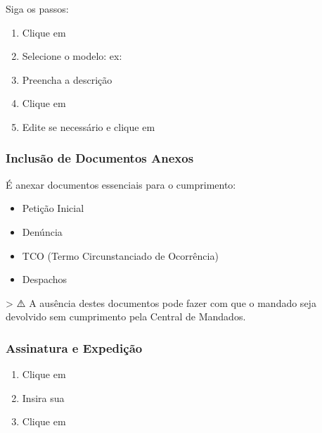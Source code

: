 \documentclass[letterpaper,10pt,brazil]{sphinxmanual}
\begin{document}
\sphinxAtStartPar
Siga os passos:
\begin{enumerate}
%
\item {} 
\sphinxAtStartPar
Clique em 

\item {} 
\sphinxAtStartPar
Selecione o modelo: ex: 

\item {} 
\sphinxAtStartPar
Preencha a descrição

\item {} 
\sphinxAtStartPar
Clique em 

\item {} 
\sphinxAtStartPar
Edite se necessário e clique em 

\end{enumerate}


\subsubsection{Inclusão de Documentos Anexos}
\label{\detokenize{projud_32_expedicaomandado:inclusao-de-documentos-anexos}}
\sphinxAtStartPar
É  anexar documentos essenciais para o cumprimento:
\begin{itemize}
\item {} 
\sphinxAtStartPar
Petição Inicial

\item {} 
\sphinxAtStartPar
Denúncia

\item {} 
\sphinxAtStartPar
TCO (Termo Circunstanciado de Ocorrência)

\item {} 
\sphinxAtStartPar
Despachos

\end{itemize}

\sphinxAtStartPar
\textgreater{} ⚠️ A ausência destes documentos pode fazer com que o mandado seja devolvido sem cumprimento pela Central de Mandados.


\subsubsection{Assinatura e Expedição}
\label{\detokenize{projud_32_expedicaomandado:assinatura-e-expedicao}}\begin{enumerate}
%
\item {} 
\sphinxAtStartPar
Clique em 

\item {} 
\sphinxAtStartPar
Insira sua 

\item {} 
\sphinxAtStartPar
Clique em 

\end{enumerate}
\end{document}
